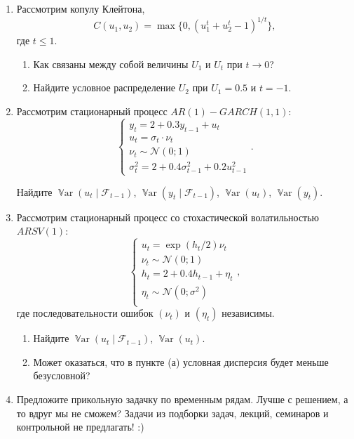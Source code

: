 \documentclass[12pt]{article}
\DeclareMathOperator{\Var}{\mathbb{V}ar}
\newcommand \cN{\mathcal{N}}
\newcommand{\cF}{\mathcal{F}}
\begin{document}
\begin{enumerate}
\item Рассмотрим копулу Клейтона, 
\[
C(u_1, u_2) = \max\{0, (u_1^t + u_2^t - 1)^{1/t} \},    
\]
где $t \leq 1$. 
\begin{enumerate}
    \item Как связаны между собой величины $U_1$ и $U_t$ при $t\to 0$?
    \item Найдите условное распределение $U_2$ при $U_1 = 0.5$ и $t = -1$.
\end{enumerate}

\item Рассмотрим стационарный процесс $AR(1)-GARCH(1,1)$:
\[
\begin{cases}
y_t = 2 + 0.3 y_{t-1} + u_t \\
u_t = \sigma_t \cdot \nu_t \\
\nu_t \sim \cN(0;1) \\
\sigma^2_t = 2 + 0.4 \sigma^2_{t-1} + 0.2u_{t-1}^2
\end{cases}.
\]

Найдите $\Var(u_t \mid \cF_{t-1})$, $\Var(y_t \mid \cF_{t-1})$, $\Var(u_t)$, $\Var(y_t)$.

\item Рассмотрим стационарный процесс со стохастической волатильностью $ARSV(1)$:
\[
\begin{cases}
u_t = \exp(h_t/2) \nu_t \\
\nu_t \sim \cN(0;1) \\
h_t = 2 + 0.4 h_{t-1} + \eta_t \\
\eta_t \sim \cN(0;\sigma^2) \\
\end{cases},
\]
где последовательности ошибок $(\nu_t)$ и $(\eta_t)$ независимы. 

\begin{enumerate}
    \item Найдите $\Var(u_t \mid \cF_{t-1})$, $\Var(u_t)$.
    \item Может оказаться, что в пункте (а) условная дисперсия будет меньше безусловной?
\end{enumerate}



\item Предложите прикольную задачку по временным рядам. 
Лучше с решением, а то вдруг мы не сможем?
Задачи из подборки задач, лекций, семинаров и контрольной не предлагать! :)


\end{enumerate}
\end{document}
